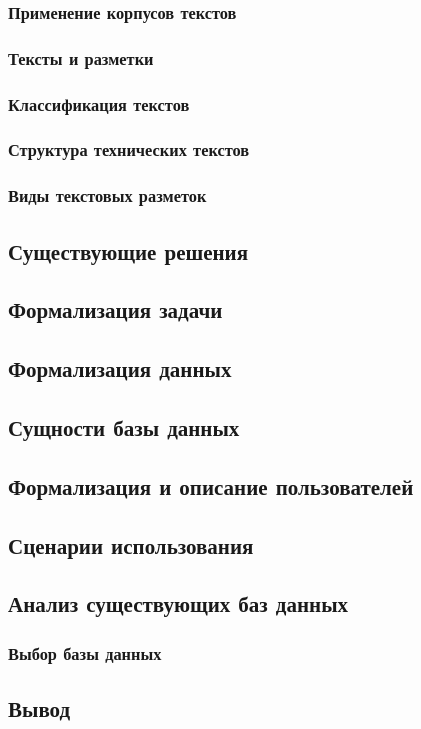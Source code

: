 \subsubsection*{Применение корпусов текстов}

\subsubsection{Тексты и разметки}

\subsubsection*{Классификация текстов}

\subsubsection*{Структура технических текстов}

\subsubsection*{Виды текстовых разметок}

\subsection{Существующие решения}

\subsection{Формализация задачи}

\subsection{Формализация данных}

\subsection{Сущности базы данных}


\subsection{Формализация и описание пользователей}

\subsection{Сценарии использования}


\subsection{Анализ существующих баз данных}

\subsubsection{Выбор базы данных}

\subsection{Вывод}
